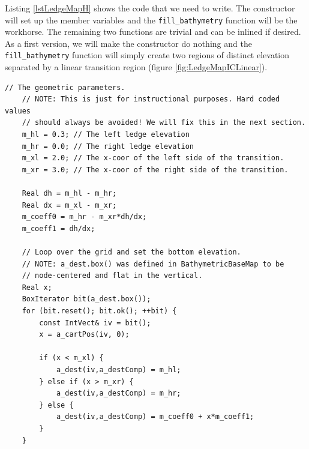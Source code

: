 \documentclass[12pt]{article}
\begin{document}
Listing \ref{lstLedgeMapH} shows the code that we need to write. The constructor will set up the member variables and the \texttt{fill\_bathymetry} function will be the workhorse. The remaining two functions are trivial and can be inlined if desired.\\

As a first version, we will make the constructor do nothing and the \texttt{fill\_bathymetry} function will simply create two regions of distinct elevation separated by a linear transition region (figure \ref{fig:LedgeMapICLinear}).\\

\begin{lstlisting}[caption={Our first version of the \texttt{fill\_bathymetry} function. This will provide a linear transition region. All geometric parameters are hard-coded.},float=h]
	// The geometric parameters.
	// NOTE: This is just for instructional purposes. Hard coded values
	// should always be avoided! We will fix this in the next section.
	m_hl = 0.3; // The left ledge elevation
	m_hr = 0.0; // The right ledge elevation
    m_xl = 2.0; // The x-coor of the left side of the transition.
    m_xr = 3.0; // The x-coor of the right side of the transition.

    Real dh = m_hl - m_hr;
    Real dx = m_xl - m_xr;
	m_coeff0 = m_hr - m_xr*dh/dx;
	m_coeff1 = dh/dx;

	// Loop over the grid and set the bottom elevation.
	// NOTE: a_dest.box() was defined in BathymetricBaseMap to be
	// node-centered and flat in the vertical.
    Real x;
    BoxIterator bit(a_dest.box());
	for (bit.reset(); bit.ok(); ++bit) {
		const IntVect& iv = bit();
		x = a_cartPos(iv, 0);

		if (x < m_xl) {
			a_dest(iv,a_destComp) = m_hl;
		} else if (x > m_xr) {
			a_dest(iv,a_destComp) = m_hr;
		} else {
			a_dest(iv,a_destComp) = m_coeff0 + x*m_coeff1;
		}
	}
\end{lstlisting}
\end{document}
